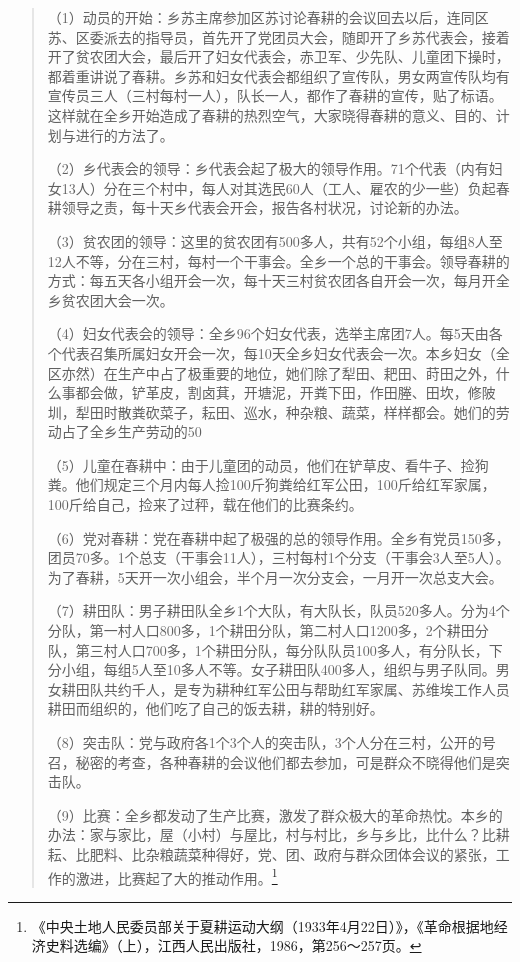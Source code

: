 \begin{quote}

（1）动员的开始：乡苏主席参加区苏讨论春耕的会议回去以后，连同区苏、区委派去的指导员，首先开了党团员大会，随即开了乡苏代表会，接着开了贫农团大会，最后开了妇女代表会，赤卫军、少先队、儿童团下操时，都着重讲说了春耕。乡苏和妇女代表会都组织了宣传队，男女两宣传队均有宣传员三人（三村每村一人），队长一人，都作了春耕的宣传，贴了标语。这样就在全乡开始造成了春耕的热烈空气，大家晓得春耕的意义、目的、计划与进行的方法了。

（2）乡代表会的领导：乡代表会起了极大的领导作用。71个代表（内有妇女13人）分在三个村中，每人对其选民60人（工人、雇农的少一些）负起春耕领导之责，每十天乡代表会开会，报告各村状况，讨论新的办法。

（3）贫农团的领导：这里的贫农团有500多人，共有52个小组，每组8人至12人不等，分在三村，每村一个干事会。全乡一个总的干事会。领导春耕的方式：每五天各小组开会一次，每十天三村贫农团各自开会一次，每月开全乡贫农团大会一次。

（4）妇女代表会的领导：全乡96个妇女代表，选举主席团7人。每5天由各个代表召集所属妇女开会一次，每10天全乡妇女代表会一次。本乡妇女（全区亦然）在生产中占了极重要的地位，她们除了犁田、耙田、莳田之外，什么事都会做，铲革皮，割卤萁，开塘泥，开粪下田，作田塍、田坎，修陂圳，犁田时散粪砍菜子，耘田、巡水，种杂粮、蔬菜，样样都会。她们的劳动占了全乡生产劳动的50%

（5）儿童在春耕中：由于儿童团的动员，他们在铲草皮、看牛子、捡狗粪。他们规定三个月内每人捡100斤狗粪给红军公田，100斤给红军家属，100斤给自己，捡来了过秤，载在他们的比赛条约。

（6）党对春耕：党在春耕中起了极强的总的领导作用。全乡有党员150多，团员70多。1个总支（干事会11人），三村每村1个分支（干事会3人至5人）。为了春耕，5天开一次小组会，半个月一次分支会，一月开一次总支大会。

（7）耕田队：男子耕田队全乡1个大队，有大队长，队员520多人。分为4个分队，第一村人口800多，1个耕田分队，第二村人口1200多，2个耕田分队，第三村人口700多，1个耕田分队，每分队队员100多人，有分队长，下分小组，每组5人至10多人不等。女子耕田队400多人，组织与男子队同。男女耕田队共约千人，是专为耕种红军公田与帮助红军家属、苏维埃工作人员耕田而组织的，他们吃了自己的饭去耕，耕的特别好。

（8）突击队：党与政府各1个3个人的突击队，3个人分在三村，公开的号召，秘密的考查，各种春耕的会议他们都去参加，可是群众不晓得他们是突击队。

（9）比赛：全乡都发动了生产比赛，激发了群众极大的革命热忱。本乡的办法：家与家比，屋（小村）与屋比，村与村比，乡与乡比，比什么？比耕耘、比肥料、比杂粮蔬菜种得好，党、团、政府与群众团体会议的紧张，工作的激进，比赛起了大的推动作用。\footnote{《中央土地人民委员部关于夏耕运动大纲（1933年4月22日）》，《革命根据地经济史料选编》（上），江西人民出版社，1986，第256～257页。}
\end{quote}



